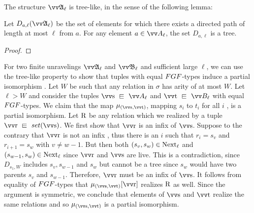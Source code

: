 \noindent
The structure $\unravel{A}_{\ell}$ is tree-like, in the sense of the following lemma:
\begin{lemma}\label{lem:companion-tree-like}
  Let $D_{a, \ell}(\unravel{A}_{\ell})$ be the set of elements for which there exists a directed path  of length at most $\ell$ from $a$.
  For any element $a \in \unraveldom{A}_{\ell}$, the set $D_{a, \ell}$ is a tree.
\end{lemma}
\begin{proof}
\end{proof}
For two finite unravelings $\unravel{A}_{\ell}$ and $\unravel{B}_{\ell}$  and sufficient large $\ell$, we can use  the tree-like property  to show that tuples with equal $\FGF$-types induce a partial isomorphism .
Let $W$ be  such that any relation in $\sigma$  has arity of at most $W$. 
Let $\ell > W$ and consider the  tuples $\elemtuptuples \sqin \unraveldom{A}_{\ell}$ and $\elemtuptuplet \sqin \unraveldom{B}_{\ell}$ with equal $\FGF$-types.
We claim that the map $\mu_{(\elemtuptuples, \elemtuptuplet)}$, mapping  $s_{i}$ to $t_{i}$ for all $i$ , is a partial isomorphism. 
Let $\mathrm{R}$ be any relation which we realized  by a tuple $\elemtuptupler \sqin \set(\elemtuptuples)$.
We first show that $\elemtuptupler$ is an infix of $\elemtuptuples$.
Suppose to the contrary that $\elemtuptupler$ is not an infix , thus there is an $i$ such that $r_{i} = s_{v}$ and $r_{i+1} = s_{w}$ with $v \ne w - 1$.
But then both $(s_{v}, s_{w}) \in \mathrm{Next}_{\ell}$ and $(s_{w-1}, s_{w}) \in \mathrm{Next}_{\ell}$ since $\elemtuptupler$ and $\elemtuptuples$ are live.
This is a contradiction, since $D_{s_{1}, W}$  includes $s_{v}, s_{w-1}$ and $s_{w}$ but cannot be a tree since $s_{w}$ would have two parents $s_{v}$ and $s_{w-1}$.
Therefore, $\elemtuptupler$ must  be an infix of $\elemtuptuples$.
It follows from equality of $\FGF$-types that $\mu_{(\elemtuptuples, \elemtuptuplet)}[\elemtuptupler]$ realizes $\mathrm{R}$ as well.
Since the argument is symmetric, we conclude that elements of $\elemtuptuples$ and $\elemtuptuplet$ realize the same relations and so $\mu_{(\elemtuptuples, \elemtuptuplet)}$ is a partial isomorphism.


